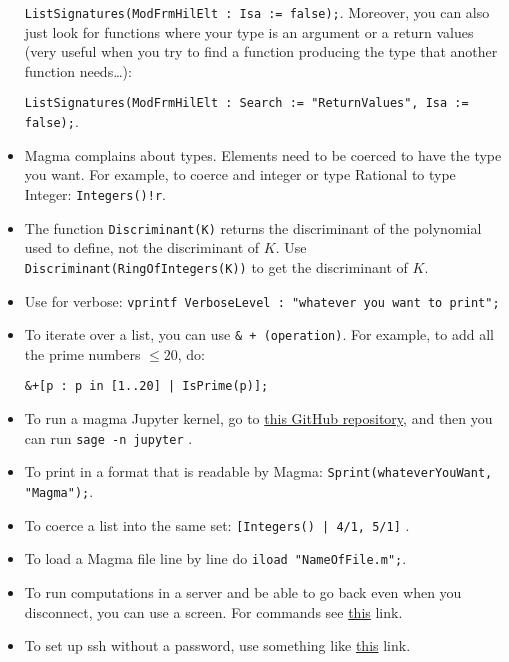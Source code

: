 \documentclass[12pt]{article}
\begin{document}
\begin{itemize}
\verb|ListSignatures(ModFrmHilElt : Isa := false);|.  Moreover, you can also just look for functions where your type is an argument or a return values (very useful when you try to find a function producing the type that another function needs…):

\verb|ListSignatures(ModFrmHilElt : Search := "ReturnValues", Isa := false);|.

\item \textsf{Magma} complains about types.  Elements need to be coerced to have the type you want. For example, to coerce and integer or type Rational  to type Integer: \verb|Integers()!r|.

\item The function \verb|Discriminant(K)| returns the discriminant of the polynomial used to define, not the discriminant of $K$. Use \verb|Discriminant(RingOfIntegers(K))| to get the discriminant of $K$.

\item Use for verbose: \verb|vprintf VerboseLevel : "whatever you want to print";|

\item To iterate over a list, you can use \verb|& + (operation)|.  For example, to add all the prime numbers $\le 20$, do: \begin{verbatim}&+[p : p in [1..20] | IsPrime(p)];\end{verbatim}

\item To run a magma Jupyter kernel, go to \href{https://github.com/edgarcosta/magma_kernel}{this GitHub repository}, and then you can run \verb|sage -n jupyter| .

\item To print in a format that is readable by \textsf{Magma}: \verb|Sprint(whateverYouWant, "Magma");|.

\item To coerce a list into the same set: 
\verb+[Integers() | 4/1, 5/1]+ .

\item To load a \textsf{Magma} file line by line do \verb|iload "NameOfFile.m";|.

\item To run computations in a server and be able to go back even when you disconnect, you can use a screen.  For commands see \href{https://linuxize.com/post/how-to-use-linux-screen/}{this} link.

\item To set up ssh without a password, use something like \href{https://www.strongdm.com/blog/ssh-passwordless-login}{this} link.


\end{itemize}
\end{document}
